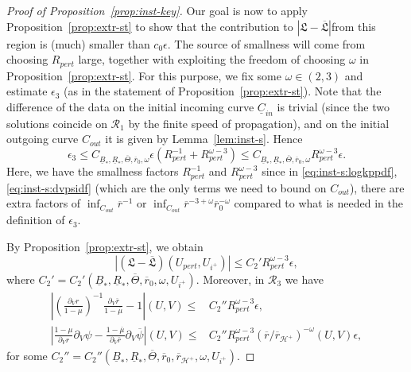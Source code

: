\documentclass[10pt, reqno]{amsart}
\theoremstyle{definition}
\theoremstyle{remark}
\theoremstyle{conjecture}
\numberwithin{equation}{section}
\newcommand{\rd}{\partial}
\newcommand{\0}{\emptyset}
\newcommand{\eps}{\epsilon}
\newcommand{\Tht}{\Theta}
\newcommand{\omg}{\omega}
\newcommand{\calH}{\mathcal H}
\newcommand{\calR}{\mathcal R}
\newcommand{\uC}{\underline{C}}
\newcommand{\EH}{\calH^{+}}
\newcommand{\psibg}{\overline{\psi}}				%
\newcommand{\rbg}{\overline{r}}					%
\newcommand{\mubg}{\overline{\mu}}				%
\newcommand{\Abs}[1]{\left\vert #1 \right\vert}
\begin{document}
\begin{proof}[Proof of Proposition~\ref{prop:inst-key}]
Our goal is now to apply Proposition~\ref{prop:extr-st} to show that the contribution to $\Abs{\mathfrak{L} - \overline{\mathfrak{L}}}$from this region is (much) smaller than $c_0\eps$. The source of smallness will come from choosing $R_{pert}$ large, together with exploiting the freedom of choosing $\omg$ in Proposition~\ref{prop:extr-st}. For this purpose, we fix some $\omg\in (2,3)$ and estimate $\eps_{3}$ (as in the statement of Proposition~\ref{prop:extr-st}). Note that the difference of the data on the initial incoming curve $\uC_{in}$ is trivial (since the two solutions coincide on $\calR_{1}$ by the finite speed of propagation), and on the initial outgoing curve $C_{out}$ it is given by Lemma~\ref{lem:inst-s}. Hence
$$\eps_{3} \leq C_{\underline{B}_{\ast}, \underline{R}_{\ast}, \overline{\Tht}, \rbg_{0}, \omg} \eps\left(R_{pert}^{-1} + R_{pert}^{\omg - 3}\right)\leq C_{\underline{B}_{\ast}, \underline{R}_{\ast}, \overline{\Tht}, \rbg_{0}, \omg} R_{pert}^{\omg - 3} \eps.$$
Here, we have the smallness factors $R_{pert}^{-1}$ and $R_{pert}^{\omg - 3}$ since in \eqref{eq:inst-s:logkppdf}, \eqref{eq:inst-s:dvpsidf} (which are the only terms we need to bound on $C_{out}$), there are extra factors of $\inf_{C_{out}}\rbg^{-1}$ or $\inf_{C_{out}}\rbg^{-3+\omg}\rbg_0^{-\omg}$ compared to what is needed in the definition of $\eps_{3}$.

By Proposition~\ref{prop:extr-st}, we obtain 
\begin{equation} \label{eq:inst-key:R3}
\Abs{(\mathfrak{L} - \overline{\mathfrak{L}})(U_{pert}, U_{i^+})}
 \leq C_{2}' R_{pert}^{\omg-3} \eps,
\end{equation}
where $C_{2}' = C_{2}' (\underline{B}_{\ast}, \underline{R}_{\ast}, \overline{\Tht}, \rbg_{0}, \omg, U_{i^{+}})$. Moreover, in $\calR_{3}$ we have
\begin{align} 
	\Abs{\left(\frac{\rd_{V} r}{1-\mu}\right)^{-1}\frac{\rd_{V} \rbg}{1-\mubg}-1} (U, V) \leq & C_{2}'' R_{pert}^{\omg-3}  \eps, \label{eq:inst-key:R3-1} \\
	\Abs{\frac{1-\mu}{\rd_{V} r} \rd_{V} \psi - \frac{1-\mubg}{\rd_{V} \rbg} \rd_{V} \psibg} (U, V) \leq & C_{2}'' R_{pert}^{\omg-3} (\rbg / \rbg_{\EH})^{-\omg} (U, V) \eps,	\label{eq:inst-key:R3-2}
\end{align}
for some $C_{2}'' = C_{2}'' (\underline{B}_{\ast}, \underline{R}_{\ast}, \overline{\Tht}, \rbg_{0}, \rbg_{\EH}, \omg, U_{i^{+}})$.


\end{proof}
\end{document}
